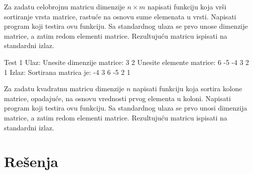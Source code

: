\begin{Exercise}[label=526]
  Za zadatu celobrojnu matricu dimenzije $n \times m$ napisati
  funkciju koja vrši sortiranje vrsta matrice, rastuće na osnovu sume
  elemenata u vrsti. Napisati program koji testira ovu funkciju. Sa
  standardnog ulaza se prvo unose dimenzije matrice, a zatim redom
  elementi matrice. Rezultujuću matricu ispisati na standardni izlaz.

\begin{maxitest}
\begin{test}{Test 1}
Ulaz:  Unesite dimenzije matrice:
       3 2
       Unesite elemente matrice:
       6 -5
       -4 3
       2 1
Izlaz: Sortirana matrica je:
       -4 3 
       6 -5 
       2 1   
\end{test}
\end{maxitest}
\end{Exercise}
\begin{Exercise}[label=343]
  Za zadatu kvadratnu matricu dimenzije $n$ napisati funkciju koja
  sortira kolone matrice, opadajuće, na osnovu vrednosti prvog
  elementa u koloni.  Napisati program koji testira ovu funkciju. Sa
  standardnog ulaza se prvo unosi dimenzija matrice, a zatim redom
  elementi matrice.  Rezultujuću matricu ispisati na standardni izlaz.
\end{Exercise}


\section{Rešenja}
\shipoutAnswer


